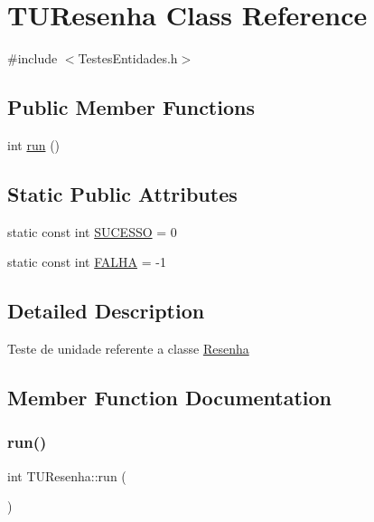\hypertarget{class_t_u_resenha}{}\section{T\+U\+Resenha Class Reference}
\label{class_t_u_resenha}


{\ttfamily \#include $<$Testes\+Entidades.\+h$>$}

\subsection*{Public Member Functions}
\begin{DoxyCompactItemize}
\item 
int \hyperlink{class_t_u_resenha_a255531383ebe29a85c654a848288d89c}{run} ()
\end{DoxyCompactItemize}
\subsection*{Static Public Attributes}
\begin{DoxyCompactItemize}
\item 
static const int \hyperlink{class_t_u_resenha_a851535b308f0a5a46a465fc428128ea0}{S\+U\+C\+E\+S\+SO} = 0
\item 
static const int \hyperlink{class_t_u_resenha_a947f43cb8d4384ab279d9884232dc5f7}{F\+A\+L\+HA} = -\/1
\end{DoxyCompactItemize}


\subsection{Detailed Description}
Teste de unidade referente a classe \hyperlink{class_resenha}{Resenha} 

\subsection{Member Function Documentation}
\mbox{\label{class_t_u_resenha_a255531383ebe29a85c654a848288d89c}} 
\subsubsection{\texorpdfstring{run()}{run()}}
{\footnotesize\ttfamily int T\+U\+Resenha\+::run (\begin{DoxyParamCaption}{ }\end{DoxyParamCaption})}

